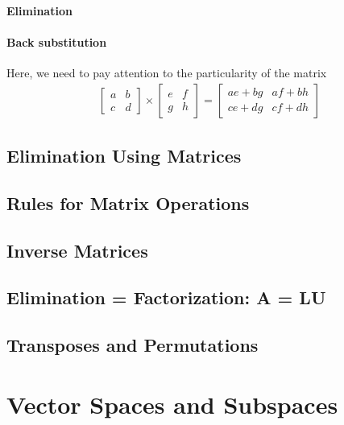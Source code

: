 \documentclass{book}
\begin{document}
    \subsubsection{Elimination}
    \subsubsection{Back substitution}
    Here, we need to pay attention to the particularity of the matrix
    \begin{align}
        \begin{bmatrix}
          a & b \\
          c & d
        \end{bmatrix}
        \times
        \begin{bmatrix}
          e & f \\
          g & h
        \end{bmatrix}
        =
        \begin{bmatrix}
          ae + bg & af + bh \\
          ce + dg & cf + dh
        \end{bmatrix}
      \end{align}



\section{Elimination Using Matrices}

\section{Rules for Matrix Operations}

\section{Inverse Matrices}

\section{Elimination = Factorization: A = LU}

\section{Transposes and Permutations}



\chapter{Vector Spaces and Subspaces}
\end{document}
